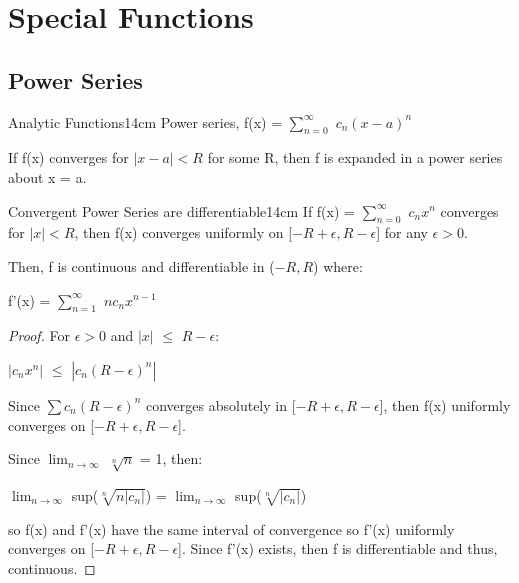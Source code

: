 \newpage

\section[Day 6: Special Functions]{ Special Functions }

\subsection{ Power Series }

    \begin{definition}{Analytic Functions}{14cm}
        Power series, f(x) = $\sum_{n=0}^{\infty}$ $c_n(x-a)^n$

        If f(x) converges for $|x-a| < R$
        for some R, then f is expanded in a power series about x = a.
    \end{definition}

    \vspace{0.5cm}



    \begin{wtheorem}{Convergent Power Series are differentiable}{14cm}
        If f(x) = $\sum_{n=0}^{\infty}$ $c_nx^n$ converges for $|x| < R$, then
        f(x) converges uniformly on [$-R+\epsilon,R-\epsilon$] for any
        $\epsilon > 0$.

        Then, f is continuous and differentiable in ($-R,R$) where:

        \hspace{0.5cm}
        f'(x) = $\sum_{n=1}^{\infty}$ $nc_nx^{n-1}$
    \end{wtheorem}

    \begin{proof}
        For $\epsilon > 0$ and $|x|$ $\leq$ $R - \epsilon$:

        \hspace{0.5cm}
        $|c_nx^n|$ $\leq$ $|c_n(R-\epsilon)^n|$

        Since $\sum c_n(R-\epsilon)^n$ converges absolutely in
        [$-R+\epsilon,R-\epsilon$], then f(x) uniformly converges on
        [$-R+\epsilon,R-\epsilon$].
        
        Since $\lim_{n \rightarrow \infty}$ $\sqrt[n]{n}$ = 1, then:

        \hspace{0.5cm}
        $\lim_{n \rightarrow \infty}$ sup($\sqrt[n]{n|c_n|}$)
        = $\lim_{n \rightarrow \infty}$ sup($\sqrt[n]{|c_n|}$)
        
        so f(x) and f'(x) have the same interval of convergence
        so f'(x) uniformly converges on [$-R+\epsilon,R-\epsilon$].
        Since f'(x) exists, then f
        is differentiable and thus, continuous. 
    \end{proof}

